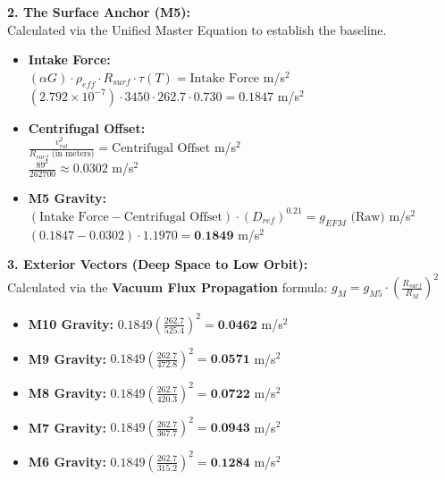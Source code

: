 \documentclass[11pt, a4paper]{article}
\begin{document}
  \vspace{1.0em}
  \noindent \textbf{2. The Surface Anchor (M5):} \\
  \hspace*{1em} Calculated via the Unified Master Equation to establish the baseline.
  \begin{itemize}
    \item \textbf{Intake Force:} \\[0.5em]
    \hspace*{2em} $(\alpha G) \cdot \rho_{eff} \cdot R_{surf} \cdot \tau(T) = \text{Intake Force}$ m/s$^2$ \\[1em]
    \hspace*{2em} $(2.792 \times 10^{-7}) \cdot 3450 \cdot 262.7 \cdot 0.730 = 0.1847$ m/s$^2$
    
    \item \textbf{Centrifugal Offset:} \\[0.5em]
    \hspace*{2em} $\frac{v_{rot}^2}{R_{surf} \text{ (in meters)}} = \text{Centrifugal Offset}$ m/s$^2$ \\[1em]
    \hspace*{2em} $\frac{89^2}{262700} \approx 0.0302$ m/s$^2$
    
    \item \textbf{M5 Gravity:} \\[0.5em]
    \hspace*{2em} $(\text{Intake Force} - \text{Centrifugal Offset}) \cdot (D_{ref})^{0.21} = g_{EFM} \text{ (Raw)}$ m/s$^2$ \\[1em]
    \hspace*{2em} $(0.1847 - 0.0302) \cdot 1.1970 = \textbf{0.1849}$ m/s$^2$
  \end{itemize}

  \clearpage
  \noindent \textbf{3. Exterior Vectors (Deep Space to Low Orbit):} \\
  \hspace*{1em} Calculated via the \textbf{Vacuum Flux Propagation} formula: $g_M = g_{M5} \cdot \left( \frac{R_{surf}}{R_M} \right)^2$
  \begin{itemize}
    \item \textbf{M10 Gravity:} $0.1849 \left( \frac{262.7}{525.4} \right)^2 = \textbf{0.0462}$ m/s$^2$
    \item \textbf{M9 Gravity:} $0.1849 \left( \frac{262.7}{472.8} \right)^2 = \textbf{0.0571}$ m/s$^2$
    \item \textbf{M8 Gravity:} $0.1849 \left( \frac{262.7}{420.3} \right)^2 = \textbf{0.0722}$ m/s$^2$
    \item \textbf{M7 Gravity:} $0.1849 \left( \frac{262.7}{367.7} \right)^2 = \textbf{0.0943}$ m/s$^2$
    \item \textbf{M6 Gravity:} $0.1849 \left( \frac{262.7}{315.2} \right)^2 = \textbf{0.1284}$ m/s$^2$
  \end{itemize}
\end{document}
